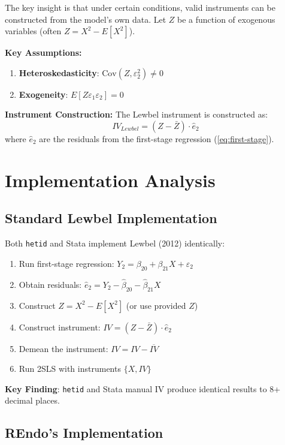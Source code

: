\documentclass[12pt]{article}
\begin{document}
The key insight is that under certain conditions, valid instruments can be constructed from the model's own data. Let $Z$ be a function of exogenous variables (often $Z = X^2 - E[X^2]$).

\textbf{Key Assumptions:}
\begin{enumerate}
\item \textbf{Heteroskedasticity}: $\text{Cov}(Z, \varepsilon_2^2) \neq 0$
\item \textbf{Exogeneity}: $E[Z\varepsilon_1\varepsilon_2] = 0$
\end{enumerate}

\textbf{Instrument Construction:}
The Lewbel instrument is constructed as:
\begin{equation}
IV_{Lewbel} = (Z - \bar{Z}) \cdot \hat{e}_2
\label{eq:lewbel-iv}
\end{equation}
where $\hat{e}_2$ are the residuals from the first-stage regression (\ref{eq:first-stage}).

\section{Implementation Analysis}

\subsection{Standard Lewbel Implementation}

Both \texttt{hetid} and Stata implement Lewbel (2012) identically:

\begin{enumerate}
\item Run first-stage regression: $Y_2 = \beta_{20} + \beta_{21}X + \varepsilon_2$
\item Obtain residuals: $\hat{e}_2 = Y_2 - \hat{\beta}_{20} - \hat{\beta}_{21}X$
\item Construct $Z = X^2 - E[X^2]$ (or use provided $Z$)
\item Construct instrument: $IV = (Z - \bar{Z}) \cdot \hat{e}_2$
\item Demean the instrument: $IV = IV - \overline{IV}$
\item Run 2SLS with instruments $\{X, IV\}$
\end{enumerate}

\textbf{Key Finding}: \texttt{hetid} and Stata manual IV produce identical results to 8+ decimal places.

\subsection{REndo's Implementation}
\end{document}
